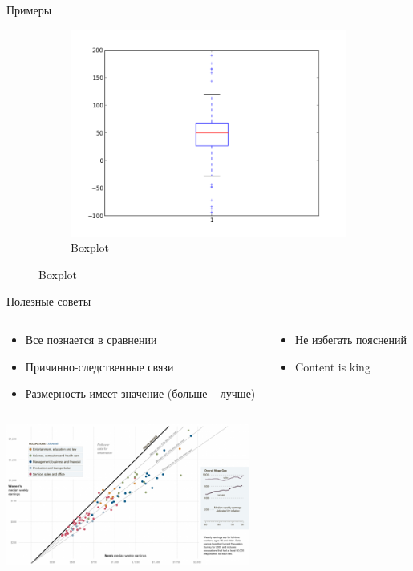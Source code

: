 \documentclass[aspectratio=169]{beamer}
\begin{document}
\begin{frame}{Примеры}
\begin{figure}
\begin{subfigure}[b]{0.3\textwidth}
                \includegraphics[width=\textwidth]{images/box.png}
                \caption{Boxplot}
        \end{subfigure}
\end{figure}

\end{frame}

\begin{frame}{Полезные советы}

\begin{columns}[T]
    \begin{column}{.5\textwidth}
    	\begin{itemize}
		\item Все познается в сравнении
		\item Причинно-следственные связи
		\item Размерность имеет значение (больше -- лучше)
		\end{itemize}
    \end{column}
    \begin{column}{.5\textwidth}
    \begin{itemize}
		\item Не избегать пояснений
		\item Content is king
		\end{itemize}
    \end{column}
  \end{columns}

  \begin{center}
   		\includegraphics[width=0.6\textwidth]{images/salaries.png}
    \end{center}

\end{frame}
\end{document}
